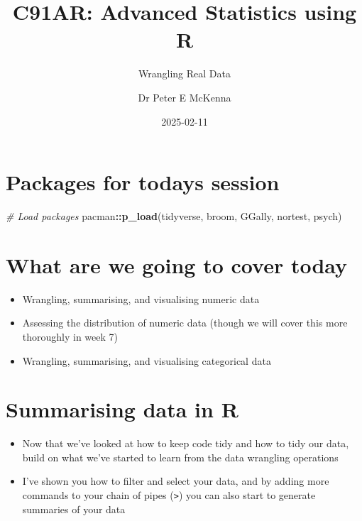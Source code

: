 \documentclass[
]{article}
\title{C91AR: Advanced Statistics using R}
\subtitle{Wrangling Real Data}
\author{Dr Peter E McKenna}
\date{2025-02-11}
\newenvironment{Shaded}{\begin{snugshade}}{\end{snugshade}}
\newcommand{\CommentTok}[1]{\textcolor[rgb]{0.56,0.35,0.01}{\textit{#1}}}
\newcommand{\FunctionTok}[1]{\textcolor[rgb]{0.13,0.29,0.53}{\textbf{#1}}}
\newcommand{\NormalTok}[1]{#1}
\newcommand{\SpecialCharTok}[1]{\textcolor[rgb]{0.81,0.36,0.00}{\textbf{#1}}}
\providecommand{\tightlist}{%
  \setlength{\itemsep}{0pt}\setlength{\parskip}{0pt}}
\begin{document}
\maketitle

{
\setcounter{tocdepth}{2}
\tableofcontents
}
\hypertarget{packages-for-todays-session}{%
\section{Packages for todays
session}\label{packages-for-todays-session}}

\begin{Shaded}
\begin{Highlighting}[]
\CommentTok{\# Load packages}
\NormalTok{pacman}\SpecialCharTok{::}\FunctionTok{p\_load}\NormalTok{(tidyverse,}
\NormalTok{               broom,}
\NormalTok{               GGally,}
\NormalTok{               nortest,}
\NormalTok{               psych)}
\end{Highlighting}
\end{Shaded}

\hypertarget{what-are-we-going-to-cover-today}{%
\section{What are we going to cover
today}\label{what-are-we-going-to-cover-today}}

\begin{itemize}
\tightlist
\item
  Wrangling, summarising, and visualising numeric data
\item
  Assessing the distribution of numeric data (though we will cover this
  more thoroughly in week 7)
\item
  Wrangling, summarising, and visualising categorical data
\end{itemize}

\hypertarget{summarising-data-in-r}{%
\section{Summarising data in R}\label{summarising-data-in-r}}

\begin{itemize}
\tightlist
\item
  Now that we've looked at how to keep code tidy and how to tidy our
  data, build on what we've started to learn from the data wrangling
  operations
\item
  I've shown you how to filter and select your data, and by adding more
  commands to your chain of pipes (\texttt{\textbar{}\textgreater{}})
  you can also start to generate summaries of your data
\end{itemize}
\end{document}
